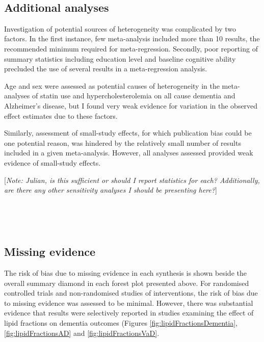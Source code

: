 \documentclass[a4paper, twoside]{templates/ociamthesis}
\begin{document}
~

\hypertarget{additional-analyses-1}{%
\subsection{Additional analyses}\label{additional-analyses-1}}

Investigation of potential sources of heterogeneity was complicated by two factors. In the first instance, few meta-analysis included more than 10 results, the recommended minimum required for meta-regression. Secondly, poor reporting of summary statistics including education level and baseline cognitive ability precluded the use of several results in a meta-regression analysis.

Age and sex were assessed as potential causes of heterogeneity in the meta-analyses of statin use and hypercholesterolemia on all cause dementia and Alzheimer's disease, but I found very weak evidence for variation in the observed effect estimates due to these factors.

Similarly, assessment of small-study effects, for which publication bias could be one potential reason, was hindered by the relatively small number of results included in a given meta-analysis. However, all analyses assessed provided weak evidence of small-study effects.

{[}\emph{Note: Julian, is this sufficient or should I report statistics for each? Additionally, are there any other sensitivity analyses I should be presenting here?}{]}

~

~

\hypertarget{missing-evidence}{%
\subsection{Missing evidence}\label{missing-evidence}}

The risk of bias due to missing evidence in each synthesis is shown beside the overall summary diamond in each forest plot presented above. For randomised controlled trials and non-randomised studies of interventions, the risk of bias due to missing evidence was assessed to be minimal. However, there was substantial evidence that results were selectively reported in studies examining the effect of lipid fractions on dementia outcomes (Figures \ref{fig:lipidFractionsDementia}, \ref{fig:lipidFractionsAD} and \ref{fig:lipidFractionsVaD}.

~
\end{document}
